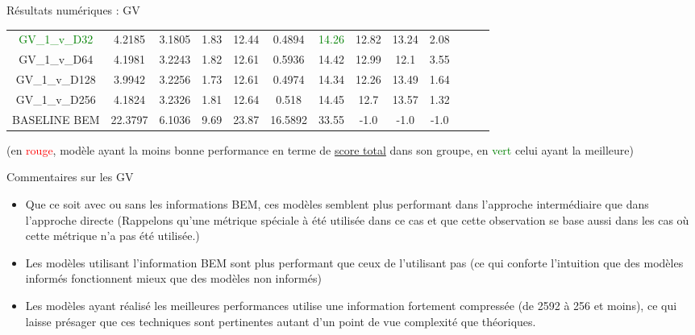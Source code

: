 \documentclass[
11pt,notheorems,hyperref={pdfauthor=whatever}
]{beamer}
\begin{document}
\begin{frame}{Résultats numériques : GV}
\begin{tabular}{| c | c c c c c c c c c c c c | }
        \textcolor{green}{GV\_1\_v\_D32} &4.2185	&3.1805	&1.83	&12.44	&0.4894	&\textcolor{green}{14.26}	&12.82	&13.24	&2.08\\
        GV\_1\_v\_D64  &4.1981	&3.2243	&1.82	&12.61	&0.5936	&14.42	&12.99	&12.1	&3.55	\\
        GV\_1\_v\_D128&3.9942	&3.2256	&1.73	&12.61	&0.4974	&14.34	&12.26	&13.49	&1.64	\\
        GV\_1\_v\_D256&4.1824	&3.2326	&1.81	&12.64	&0.518	&14.45	&12.7	&13.57	&1.32\\
        \hline
        BASELINE BEM  &22.3797	&6.1036	&9.69	&23.87		&16.5892	&33.55 &-1.0	&-1.0	&-1.0\\
        \hline
    \end{tabular}

    \vspace{0.3cm}

    (en \textcolor{red}{rouge}, modèle ayant la moins bonne performance en terme de \underline{score total} dans son groupe, en \textcolor{green}{vert} celui ayant la meilleure)

\end{frame}

\begin{frame}{Commentaires sur les GV}
    \begin{itemize}
        \item Que ce soit avec ou sans les informations BEM, ces modèles semblent plus performant dans l'approche intermédiaire que dans l'approche directe (Rappelons qu'une métrique spéciale à été utilisée dans ce cas et que cette observation se base aussi dans les cas où cette métrique n'a pas été utilisée.)
        \item Les modèles utilisant l'information BEM sont plus performant que ceux de l'utilisant pas (ce qui conforte l'intuition que des modèles informés fonctionnent mieux que des modèles non informés)
        \item Les modèles ayant réalisé les meilleures performances utilise une information fortement compressée (de 2592 à 256 et moins), ce qui laisse présager que ces techniques sont pertinentes autant d'un point de vue complexité que théoriques. 
    \end{itemize}
\end{frame}
\end{document}

